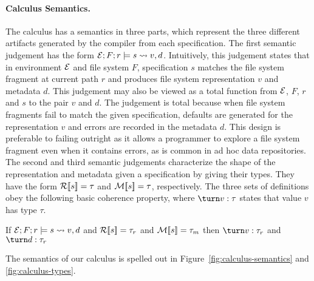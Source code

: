 \paragraph*{Calculus Semantics.}
The calculus has a semantics in three parts, which represent the three different
artifacts generated by the \forest{} compiler from each specification.  The
first semantic judgement has the form $\mathcal{E};F;r \models s \rightsquigarrow v,d$.
Intuitively, this judgement states that in environment $\mathcal{E}$ and file system
$F$, specification $s$ matches the file system fragment at current path $r$
and produces file system representation $v$ and metadata $d$.  This judgement
may also be viewed as a total function from $\mathcal{E}$, $F$, $r$ and $s$ to the
pair $v$ and $d$.  The judgement is total because when file system fragments
fail to match the given specification, defaults are generated for the representation
$v$ and errors are recorded in the metadata $d$.  This design is preferable to
failing outright as it allows a programmer
to explore a file system fragment even when it contains errors, as is common
in ad hoc data repositories.  The second and third
semantic judgements characterize the shape of the representation and metadata
given a specification by giving their types.  They have the form ${\cal R}[\![ s ]\!] = \tau$ and
${\cal M}[\![ s ]\!] = \tau$, respectively.  The three sets of definitions obey the following
basic coherence property, where $\turn v : \tau$ states that value $v$ has type $\tau$.

\begin{proposition}
If $\mathcal{E};F;r \models s \rightsquigarrow v,d$ and
${\cal R}[\![ s ]\!] = \tau_r$ and ${\cal M}[\![ s ]\!] = \tau_m$
then $\turn v : \tau_r$ and $\turn d : \tau_r$ 
\end{proposition}


The semantics of our calculus is spelled out in Figure~\ref{fig:calculus-semantics} 
and \ref{fig:calculus-types}.

